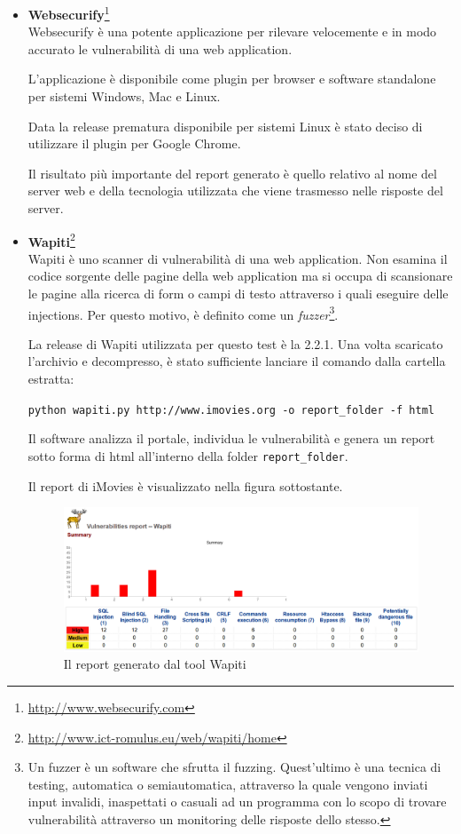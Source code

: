 \documentclass{article}
\begin{document}
\begin{itemize}
\item \textbf{Websecurify}\footnote{\url{http://www.websecurify.com}}\\
Websecurify è una potente applicazione per rilevare velocemente e in modo accurato le vulnerabilità di una web application.

L'applicazione è disponibile come plugin per browser e software standalone per sistemi Windows, Mac e Linux.

Data la release prematura disponibile per sistemi Linux è stato deciso di utilizzare il plugin per Google Chrome.

Il risultato più importante del report generato è quello relativo al nome del server web e della tecnologia utilizzata che viene trasmesso nelle risposte del server.

\item \textbf{Wapiti}\footnote{\url{http://www.ict-romulus.eu/web/wapiti/home}}\\
Wapiti è uno scanner di vulnerabilità di una web application.
Non esamina il codice sorgente delle pagine della web application ma si occupa di scansionare le pagine alla ricerca di form o campi di testo attraverso i quali eseguire delle injections. Per questo motivo, è definito come un \emph{fuzzer}\footnote{Un fuzzer è un software che sfrutta il fuzzing. Quest'ultimo è una tecnica di testing, automatica o semiautomatica, attraverso la quale vengono inviati input invalidi, inaspettati o casuali ad un programma con lo scopo di trovare vulnerabilità attraverso un monitoring delle risposte dello stesso.}.

La release di Wapiti utilizzata per questo test è la 2.2.1.
Una volta scaricato l'archivio e decompresso, è stato sufficiente lanciare il comando dalla cartella estratta:
\begin{center}
\small
{\tt python wapiti.py http://www.imovies.org -o report\_folder -f html}
\end{center}

Il software analizza il portale, individua le vulnerabilità e genera un report sotto forma di html all'interno della folder {\tt report\_folder}.

Il report di iMovies è visualizzato nella figura sottostante.
\begin{figure}[h!]\label{wapiti}
\centering
\includegraphics[width=\textwidth]{img/wapiti}
\caption{Il report generato dal tool Wapiti}
\end{figure}


\end{itemize}
\end{document}
